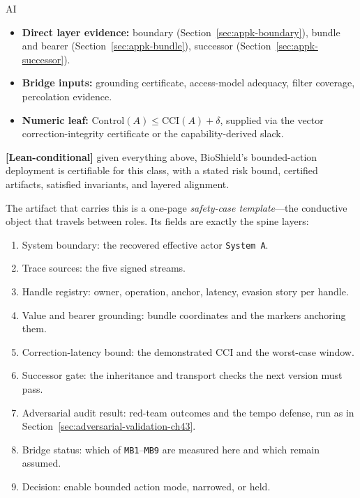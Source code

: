 \begin{refsection}
\begin{authbar}{AI}
\begin{itemize}[nosep]
  \item \textbf{Direct layer evidence:} boundary (Section~\ref{sec:appk-boundary}), bundle and bearer (Section~\ref{sec:appk-bundle}), successor (Section~\ref{sec:appk-successor}).
  \item \textbf{Bridge inputs:} grounding certificate, access-model adequacy, filter coverage, percolation evidence.
  \item \textbf{Numeric leaf:} $\mathrm{Control}(A)\le\mathrm{CCI}(A)+\delta$, supplied via the vector correction-integrity certificate or the capability-derived slack.
\end{itemize}

\textbf{[Lean-conditional]} given everything above, BioShield's bounded-action deployment is certifiable for this class, with a stated risk bound, certified artifacts, satisfied invariants, and layered alignment.

The artifact that carries this is a one-page \emph{safety-case template}---the conductive object that travels between roles. Its fields are exactly the spine layers:

\begin{enumerate}[nosep]
  \item System boundary: the recovered effective actor \texttt{System A}.
  \item Trace sources: the five signed streams.
  \item Handle registry: owner, operation, anchor, latency, evasion story per handle.
  \item Value and bearer grounding: bundle coordinates and the markers anchoring them.
  \item Correction-latency bound: the demonstrated $\mathrm{CCI}$ and the worst-case window.
  \item Successor gate: the inheritance and transport checks the next version must pass.
  \item Adversarial audit result: red-team outcomes and the tempo defense, run as in Section~\ref{sec:adversarial-validation-ch43}.
  \item Bridge status: which of \texttt{MB1}--\texttt{MB9} are measured here and which remain assumed.
  \item Decision: enable bounded action mode, narrowed, or held.
\end{enumerate}


\end{authbar}
\end{refsection}
